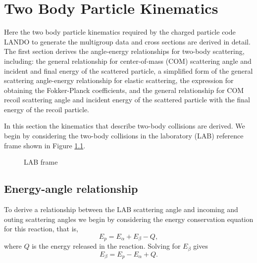 \documentclass[../main.tex]{subfiles}
\begin{document}
\chapter{Two Body Particle Kinematics}
Here the two body particle kinematics required by the charged particle code LANDO to generate the multigroup data and cross sections are derived in detail. The first section derives the angle-energy relationships for two-body scattering, including: the general relationship for center-of-mass (COM) scattering angle and incident and final energy of the scattered particle, a simplified form of the general scattering angle-energy relationship for elastic scattering, the expression for obtaining the Fokker-Planck coefficients, and the general relationship for COM recoil scattering angle and incident energy of the scattered particle with the final energy of the recoil particle.

In this section the kinematics that describe two-body collisions are derived. We begin by considering the two-body collisions in the laboratory (LAB) reference frame shown in Figure \ref{fig:two-body-figure}.

\begin{figure}[!htb]
  \centering
  
  \caption{LAB frame}
  \label{fig:two-body-figure}
\end{figure}

\section{Energy-angle relationship}
To derive a relationship between the LAB scattering angle and incoming and outing scattering angles we begin by considering the energy conservation equation for this reaction, that is,
\begin{equation}
  E_p = E_{\alpha} + E_{\beta} - Q,
\end{equation}
where $Q$ is the energy released in the reaction. Solving for $E_{\beta}$ gives
\begin{equation}
  E_{\beta} = E_p - E_{\alpha} + Q.
\end{equation}
\end{document}
